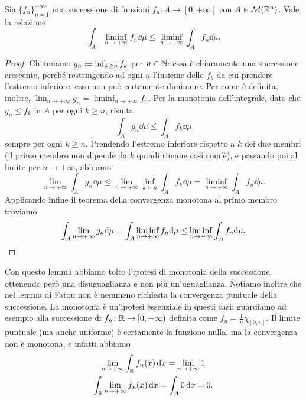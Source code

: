 \begin{lemma}[di Fatou] \label{l:fatou}
	Sia $\{f_n\}_{n=1}^{+\infty}$ una successione di funzioni $f_n\colon A\to[0,+\infty]$ con $A\in\mathcal M(\mathbb{R}^n)$.
	Vale la relazione
	\begin{equation}
		\int_A\liminf_{n\to+\infty}f_n\dd\mu\leq\liminf_{n\to+\infty}\int_Af_n\dd\mu.
		\label{eq:fatou}
	\end{equation}
\end{lemma}
\begin{proof}
	Chiamiamo $g_n\defeq\inf_{k\geq n}f_k$ per $n\in\mathbb{N}$: essa è chiaramente una successione crescente, perch\'e restringendo ad ogni $n$ l'insieme delle $f_k$ da cui prendere l'estremo inferiore, esso non può certamente diminuire.
	Per come è definita, inoltre, $\lim_{n\to+\infty}g_n=\liminf_{n\to+\infty}f_n$.
	Per la monotonia dell'integrale, dato che $g_n\leq f_k$ in $A$ per ogni $k\geq n$, risulta
	\begin{equation}
		\int_Ag_n\dd\mu\leq\int_Af_k\dd\mu
	\end{equation}
	sempre per ogni $k\geq n$.
	Prendendo l'estremo inferiore rispetto a $k$ dei due membri (il primo membro non dipende da $k$ quindi rimane cos\'i com'è), e passando poi al limite per $n\to+\infty$, abbiamo
	\begin{equation}
		\lim_{n\to+\infty}\int_Ag_n\dd\mu\leq\lim_{n\to+\infty}\inf_{k\geq n}\int_Af_k\dd\mu=\liminf_{n\to+\infty}\int_Af_n\dd\mu.
	\end{equation}
	Applicando infine il teorema della convergenza monotona al primo membro troviamo
	\begin{equation}
		\int_A\lim_{n\to+\infty}g_n\textup{d}\mu=\int_A\liminf_{n\to+\infty}f_n\textup{d}\mu\leq\liminf_{n\to+\infty}\int_Af_n\textup{d}\mu.\qedhere
	\end{equation}
\end{proof}
Con questo lemma abbiamo tolto l'ipotesi di monotonia della successione, ottenendo però una disuguaglianza e non più un'uguaglianza.
Notiamo inoltre che nel lemma di Fatou non è nemmeno richiesta la convergenza puntuale della successione.
La monotonia è un'ipotesi essenziale in questi casi: guardiamo ad esempio alla successione di $f_n\colon\mathbb{R}\to[0,+\infty)$ definita come $f_n=\frac1{n}\chi_{[0,n]}$.
Il limite puntuale (ma anche uniforme) è certamente la funzione nulla, ma la convergenza non è monotona, e infatti abbiamo
\begin{gather*}
	\lim_{n\to+\infty}\int_{\mathbb{R}}f_n(x)\,\textup{d} x=\lim_{n\to+\infty}1\\
	\int_{\mathbb{R}}\lim_{n\to+\infty}f_n(x)\,\textup{d} x=\int_A0\,\textup{d} x=0.
\end{gather*}

